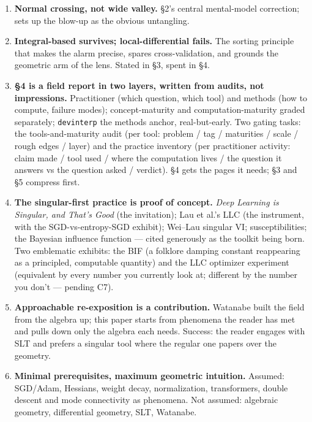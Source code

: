 \documentclass[11pt]{article}
\begin{document}
\begin{enumerate}[label=(\alph*), itemsep=6pt]
\item \textbf{Normal crossing, not wide valley.} \S2's central
mental-model correction; sets up the blow-up as the obvious untangling.

\item \textbf{Integral-based survives; local-differential fails.} The
sorting principle that makes the alarm precise, spares cross-validation,
and grounds the geometric arm of the lens. Stated in \S3, spent in \S4.

\item \textbf{\S4 is a field report in two layers, written from
audits, not impressions.} Practitioner (which question, which tool) and
methods (how to compute, failure modes); concept-maturity and
computation-maturity graded separately; \texttt{devinterp} the methods
anchor, real-but-early. Two gating tasks: the tools-and-maturity audit
(per tool: problem / tag / maturities / scale / rough edges / layer) and
the practice inventory (per practitioner activity: claim made / tool
used / where the computation lives / the question it answers vs the
question asked / verdict). \S4 gets the pages it needs; \S3 and \S5
compress first.

\item \textbf{The singular-first practice is proof of concept.}
\emph{Deep Learning is Singular, and That's Good} (the invitation);
Lau et al.'s LLC (the instrument, with the SGD-vs-entropy-SGD exhibit);
Wei--Lau singular VI; susceptibilities; the Bayesian influence function
--- cited generously as the toolkit being born. Two emblematic exhibits:
the BIF (a folklore damping constant reappearing as a principled,
computable quantity) and the LLC optimizer experiment (equivalent by
every number you currently look at; different by the number you don't
--- pending C7).

\item \textbf{Approachable re-exposition is a contribution.} Watanabe
built the field from the algebra up; this paper starts from phenomena
the reader has met and pulls down only the algebra each needs. Success:
the reader engages with SLT and prefers a singular tool where the
regular one papers over the geometry.

\item \textbf{Minimal prerequisites, maximum geometric intuition.}
Assumed: SGD/Adam, Hessians, weight decay, normalization, transformers,
double descent and mode connectivity as phenomena. Not assumed:
algebraic geometry, differential geometry, SLT, Watanabe.


\end{enumerate}
\end{document}
